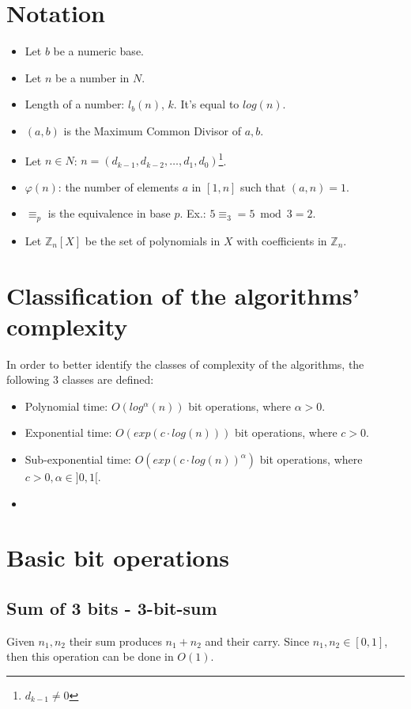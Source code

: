 \section{Notation}
\begin{itemize}
    \item Let $b$ be a numeric base.
    \item Let $n$ be a number in $N$.
    \item Length of a number: $l_{b}(n)$, $k$. It's equal to $log(n)$.
    \item $(a,b)$ is the Maximum Common Divisor of $a,b$.
    \item Let $n \in N$: $n = (d_{k-1}, d_{k-2}, \dots, d_{1}, d_{0})$\footnote{$d_{k-1} \neq 0$}.
    \item $\varphi(n)$: the number of elements $a$ in $[1,n]$ such that $(a,n) = 1$.
    \item $\equiv_{p}$ is the equivalence in base $p$. Ex.: $5 \equiv_{3} = 5 \bmod 3 = 2 $.
    \item Let $\mathbb{Z}_{n}[X]$ be the set of polynomials in $X$ with coefficients in $\mathbb{Z}_{n}$.
\end{itemize}


\section{Classification of the algorithms' complexity}
In order to better identify the classes of complexity of the algorithms, the following 3 classes are defined:
\begin{itemize}
    \item Polynomial time: $O(log^{\alpha}(n))$ bit operations, where $\alpha > 0$.
    \item Exponential time: $O(exp(c \cdot log(n)))$ bit operations, where $c > 0$.
    \item Sub-exponential time: $O(exp(c \cdot log(n))^{\alpha})$ bit operations, where $c > 0, \alpha \in ]0, 1[$.
\item
\end{itemize}



\section{Basic bit operations}
\subsection{Sum of 3 bits - 3-bit-sum}
Given $n_{1}, n_{2}$ their sum produces $n_{1} + n_{2}$ and their carry. \newline
Since $n_{1}, n_{2} \in [0,1]$, then this operation can be done in $O(1)$.


